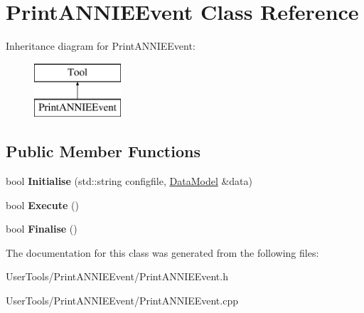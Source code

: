 \hypertarget{classPrintANNIEEvent}{\section{Print\-A\-N\-N\-I\-E\-Event Class Reference}
\label{classPrintANNIEEvent}
}
Inheritance diagram for Print\-A\-N\-N\-I\-E\-Event\-:\begin{figure}[H]
\begin{center}
\leavevmode
\includegraphics[height=2.000000cm]{classPrintANNIEEvent}
\end{center}
\end{figure}
\subsection*{Public Member Functions}
\begin{DoxyCompactItemize}
\item 
\hypertarget{classPrintANNIEEvent_a837c3af8455ac4ad69218de09e1a9904}{bool {\bfseries Initialise} (std\-::string configfile, \hyperlink{classDataModel}{Data\-Model} \&data)}\label{classPrintANNIEEvent_a837c3af8455ac4ad69218de09e1a9904}

\item 
\hypertarget{classPrintANNIEEvent_aebc14f16147292bfe4c9dcd0b433bee2}{bool {\bfseries Execute} ()}\label{classPrintANNIEEvent_aebc14f16147292bfe4c9dcd0b433bee2}

\item 
\hypertarget{classPrintANNIEEvent_a164df9cb5bd54feadb715dd0a73eb9d3}{bool {\bfseries Finalise} ()}\label{classPrintANNIEEvent_a164df9cb5bd54feadb715dd0a73eb9d3}

\end{DoxyCompactItemize}


The documentation for this class was generated from the following files\-:\begin{DoxyCompactItemize}
\item 
User\-Tools/\-Print\-A\-N\-N\-I\-E\-Event/Print\-A\-N\-N\-I\-E\-Event.\-h\item 
User\-Tools/\-Print\-A\-N\-N\-I\-E\-Event/Print\-A\-N\-N\-I\-E\-Event.\-cpp\end{DoxyCompactItemize}
